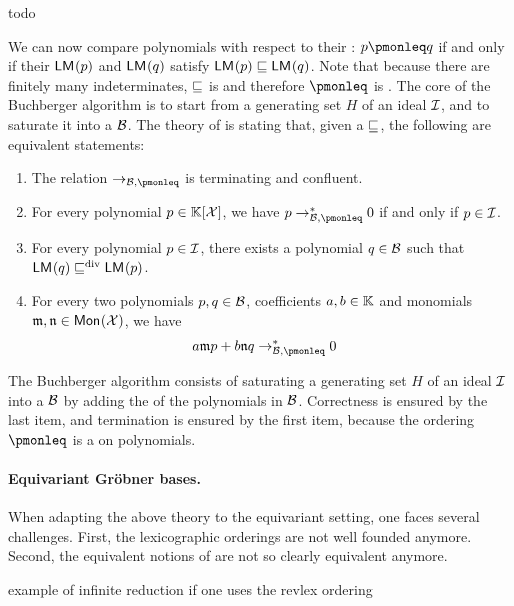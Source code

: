 \begin{example}
  todo
\end{example}

\AP
We can now compare polynomials with respect to their :
$p \pmonleq q$ if and only if their 
$\mathop{\mathsf{LM}_{}}(p)$ and $\mathop{\mathsf{LM}_{}}(q)$ satisfy $\mathop{\mathsf{LM}_{}}(p) \sqsubseteq \mathop{\mathsf{LM}_{}}(q)$.
Note that because there are finitely many indeterminates,
$\sqsubseteq$ is  and therefore $\pmonleq$
is .
The core of the Buchberger algorithm is to start from a generating
set $H$ of an ideal $\idl$, and to saturate it into a
 $\Basis$. The theory of  is
stating that, given a  $\sqsubseteq$, the following
are equivalent statements:
\begin{enumerate}
  \item The relation $\to_{\Basis,\pmonleq}$ is terminating and confluent.
  \item For every polynomial $p \in \mathbb{K}[\mathcal{X}]$, we have
    $p \to_{\Basis,\pmonleq}^* 0$ if and only if $p \in \idl$.
  \item For every polynomial $p \in \idl$, there exists a polynomial $q \in \Basis$ such that
    $\mathop{\mathsf{LM}_{}}(q) \mathrel{\sqsubseteq^{\mathrm{div}}} \mathop{\mathsf{LM}_{}}(p)$.
  \item For every two polynomials 
    $p,q \in \Basis$,
    coefficients $a,b \in \mathbb{K}$ and monomials $\monelt,\monelt[n] \in \mon{\X}$, we have
    \begin{align*}
      a \monelt p + b \monelt[n] q & \to_{\Basis,\pmonleq}^* 0
    \end{align*}
\end{enumerate}
The Buchberger algorithm consists of
saturating a generating set $H$ of an ideal $\idl$ into a  $\Basis$ by
adding the  of the polynomials in $\Basis$.
Correctness is ensured by the last item, and termination is ensured by the first item,
because the ordering $\pmonleq$ is a  on polynomials.

\paragraph{Equivariant Gröbner bases.}
\AP
When adapting the above theory to the equivariant setting, one faces
several challenges. First, the lexicographic orderings are not well founded
anymore. Second, the equivalent notions of 
 are not so clearly equivalent anymore.

\begin{example}
  example of infinite reduction if one uses the revlex ordering 
\end{example}
